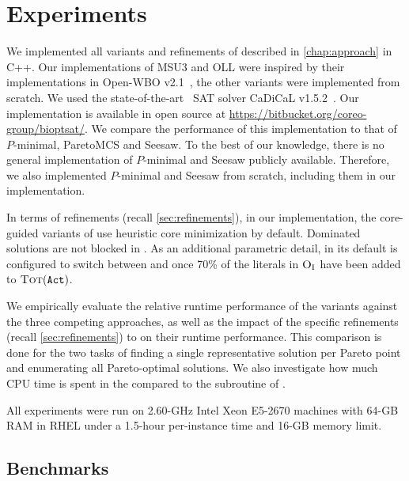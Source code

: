 \chapter{Experiments\label{chap:experiments}}

We implemented  all variants and refinements of \algname{} described in \cref{chap:approach} in C++.
Our implementations of MSU3 and OLL were inspired by their implementations in Open-WBO v2.1~\autocite{DBLP:conf/sat/MartinsML14}, the other variants were implemented from scratch.
We used the state-of-the-art~\autocite{DBLP:journals/ai/FroleyksHIJS21} SAT solver CaDiCaL v1.5.2~\autocite{BiereFazekasFleuryHeisinger-SAT-Competition-2020-solvers}.
Our implementation is available in open source at \url{https://bitbucket.org/coreo-group/bioptsat/}.
We compare the performance of this implementation to that of $P$-minimal, ParetoMCS and Seesaw.
To the best of our knowledge, there is no general implementation of $P$-minimal and Seesaw publicly available.
Therefore, we also implemented $P$-minimal and Seesaw from scratch, including them in our implementation.

In terms of refinements (recall \cref{sec:refinements}), in our implementation, the core-guided variants of \algname{} use heuristic core minimization by default.
Dominated solutions are not blocked in \satunsat{}.
As an additional parametric detail, in its default \msh{} is configured to switch between \msu{} and \satunsat{} once 70\% of the literals in $\textsc{O}_{\text{I}}$ have been added to $\textsc{Tot}(\texttt{Act})$.

We empirically evaluate the relative runtime performance of the \algname{} variants against the three competing approaches, as well as the impact of the specific refinements (recall \cref{sec:refinements}) to \algname{} on their runtime performance.
This comparison is done for the two tasks of finding a single representative solution per Pareto point and enumerating all Pareto-optimal solutions.
We also investigate how much CPU time is spent in the \Min{} compared to the \Simpr{} subroutine of \algname{}.

All experiments were run on 2.60-GHz Intel Xeon E5-2670 machines with 64-GB RAM in RHEL under a 1.5-hour per-instance time and 16-GB memory limit.

\section{Benchmarks\label{sec:benchmarks}}

